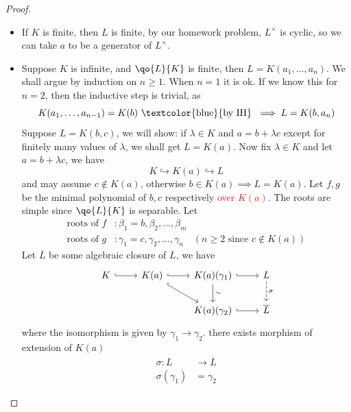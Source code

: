\begin{proof}
	\leavevmode
	\begin{itemize}
		\item If \( K \) is finite, then \( L \) is finite, by our homework problem, \( L^\times \) is cyclic,
		      so we can take \( a \) to be a generator of \( L^\times \).
		\item Suppose \( K \) is infinite, and \( \qo{L}{K} \) is finite, then \( L = K(a_1,\ldots, a_n) \). We shall argue
		      by induction on \( n\geq 1 \). When \( n = 1 \) it is ok. If we know this for \( n = 2 \),
		      then the inductive step is trivial, as
		      \[
			      K(a_1,\ldots, a_{n-1}) = K(b) \text{ \textcolor{blue}{by IH} } \implies L = K(b,a_n)
		      \]
		      Suppose \( L = K(b,c) \), we will show: if \( \lambda \in K \) and \( a = b + \lambda c \)
		      except for finitely many values of \( \lambda \), we shall get \( L = K(a) \). Now fix \(
		      \lambda \in K \) and let \( a = b + \lambda c \), we have
		      \[
			      K \hookrightarrow K(a) \hookrightarrow L
		      \]
		      and may assume \( c\not\in K(a) \), otherwise \( b \in K(a) \implies L = K(a) \). Let \( f,g \) be the minimal polynomial
		      of \( b,c \) respectively \textcolor{red}{over \( K(a) \)}. The roots are simple since \( \qo{L}{K} \) is separable. Let
		      \begin{align*}
			      \text{roots of }f & : \beta_1=b, \beta_2,\ldots, \beta_m                                      \\
			      \text{roots of }g & : \gamma_1 = c, \gamma_2,\ldots, \gamma_n \quad (n\geq 2 \text{ since } c
			      \not\in K(a))
		      \end{align*}
		      Let \( \overline{L} \) be some algebraic closure of \( L \), we have
		      \[
			      \begin{tikzcd}
				      K\arrow[hook, r] & K(a) \arrow[hook, r] \arrow[hook,rd] & K(a)(\gamma_1)
				      \arrow[hook,r]\arrow[d, "\sim"] & L \arrow[dashed, "\sigma", d] \\
				      & & K(a)(\gamma_2) \arrow[hook,r] & \overline{L}
			      \end{tikzcd}
		      \]
		      where the isomorphism is given by \( \gamma_1 \to \gamma_2 \). there exists morphism of extension of \( K(a) \)
		      \[
			      \begin{aligned}
				      \sigma: L         & \to \overline{L} \\
				      \sigma(\gamma _1) & = \gamma _2
			      \end{aligned}
\]
\end{itemize}
\end{proof}
